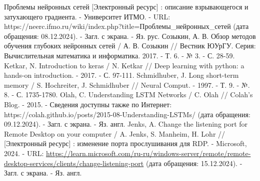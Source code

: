 \documentclass[bachelor, och, coursework]{SCWorks}
\begin{document}
\begin{thebibliography}{20}
    Проблемы нейронных сетей [Электронный ресурс] : описание взрывающегося и затухающего градиента. - Университет ИТМО. - URL: https://neerc.ifmo.ru/wiki/index.php?title=Проблемы_нейронных_сетей (дата обращения: 08.12.2024). - Загл. с экрана. -  Яз. рус.
    Созыкин, А. В. Обзор методов обучения глубоких нейронных сетей / А. В. Созыкин // Вестник ЮУрГУ. Серия: Вычислительная математика и информатика. 2017. - Т. 6. - № 3. - С. 28-59.
    Ketkar, N. Introduction to keras / N. Ketkar // Deep learning with python: a hands-on introduction. - 2017. - С. 97-111.
    Schmidhuber, J. Long short-term memory / S. Hochreiter, J. Schmidhuber // Neural Comput. - 1997. - Т. 9. - №. 8. - С. 1735-1780.
    Olah, C. Understanding LSTM Networks / C. Olah // Colah's Blog. - 2015. - Сведения доступны также по Интернет: https://colah.github.io/posts/2015-08-Understanding-LSTMs/ (дата обращения: 09.12.2024). - Загл. с экрана. - Яз. англ.
    Jenks, A. Change the listening port for Remote Desktop on your computer / A. Jenks, S. Manheim, H. Lohr // [Электронный ресурс] : изменение порта прослушивания для RDP. - Microsoft, 2024. - URL: \url{https://learn.microsoft.com/ru-ru/windows-server/remote/remote-desktop-services/clients/change-listening-port} (дата обращения: 15.12.2024). - Загл. с экрана. - Яз. англ.
  \end{thebibliography}
\end{document}
